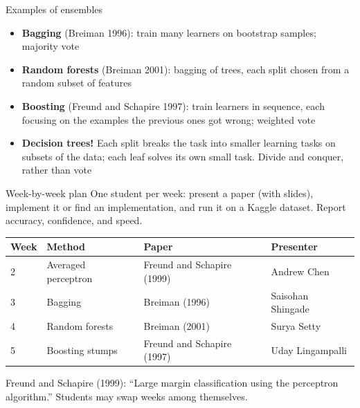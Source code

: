 \documentclass[aspectratio=169]{beamer}
\begin{document}
\begin{frame}{Examples of ensembles}
  \begin{itemize}
    \item \textbf{Bagging} (Breiman 1996): train many learners on bootstrap samples; majority vote
    \item \textbf{Random forests} (Breiman 2001): bagging of trees, each split chosen from a random subset of features
    \item \textbf{Boosting} (Freund and Schapire 1997): train learners in sequence, each focusing on the examples the previous ones got wrong; weighted vote
    \item \textbf{Decision trees!} Each split breaks the task into smaller learning tasks on subsets of the data; each leaf solves its own small task. Divide and conquer, rather than vote
  \end{itemize}
\end{frame}

\begin{frame}{Week-by-week plan}
  One student per week: present a paper (with slides), implement it or find an implementation, and run it on a Kaggle dataset. Report accuracy, confidence, and speed.

  \vspace{0.4cm}
  \centering
  \small
  \begin{tabular}{llll}
    \toprule
    Week & Method & Paper & Presenter \\
    \midrule
    2 & Averaged perceptron & Freund and Schapire (1999) & Andrew Chen \\
    3 & Bagging & Breiman (1996) & Saisohan Shingade \\
    4 & Random forests & Breiman (2001) & Surya Setty \\
    5 & Boosting stumps & Freund and Schapire (1997) & Uday Lingampalli \\
    \bottomrule
  \end{tabular}

  \vspace{0.4cm}
  \raggedright
  \footnotesize Freund and Schapire (1999): ``Large margin classification using the perceptron algorithm.'' Students may swap weeks among themselves.
\end{frame}
\end{document}
